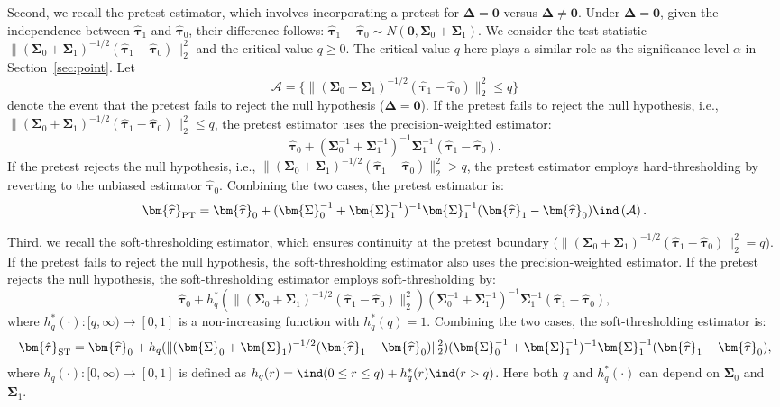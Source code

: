 \documentclass[11pt]{article}
\newcommand{\htau}{\widehat\tau}
\numberwithin{equation}{section}
\theoremstyle{definition}
\begin{document}
Second, we recall the pretest estimator, which involves incorporating a pretest for $\bm{\Delta} = \bm{0}$ versus $\bm{\Delta} \neq \bm{0}$. Under $\bm{\Delta} = \bm{0}$, given the independence between $\bm{\htau}_1$ and $\bm{\htau}_0$, their difference follows: $\bm{\htau}_1 - \bm{\htau}_0 \sim N(\bm{0}, \bm{\Sigma}_0 + \bm{\Sigma}_1)$. We consider the test statistic $\lVert (\bm{\Sigma}_0+ \bm{\Sigma}_1)^{-1/2}(\bm{\htau}_1 - \bm{\htau}_0) \rVert_2^2$ and the critical value $q \ge 0$. The critical value $q$ here plays a similar role as the significance level $\alpha$ in Section~\ref{sec:point}. Let $$\mathcal{A} = \{\lVert (\bm{\Sigma}_0+ \bm{\Sigma}_1)^{-1/2}(\bm{\htau}_1 - \bm{\htau}_0) \rVert_2^2 \le q\}$$ denote the event that the pretest fails to reject the null hypothesis ($\bm{\Delta} = \bm{0}$). If the pretest fails to reject the null hypothesis, i.e., $\lVert (\bm{\Sigma}_0+ \bm{\Sigma}_1)^{-1/2}(\bm{\htau}_1 - \bm{\htau}_0) \rVert_2^2 \le q$, the pretest estimator uses the precision-weighted estimator:
\[
  \bm{\htau}_0 + (\bm{\Sigma}_0^{-1} + \bm{\Sigma}_1^{-1})^{-1} \bm{\Sigma}_1^{-1} (\bm{\htau}_1 - \bm{\htau}_0).
\]
If the pretest rejects the null hypothesis, i.e., $\lVert (\bm{\Sigma}_0+ \bm{\Sigma}_1)^{-1/2}(\bm{\htau}_1 - \bm{\htau}_0) \rVert_2^2 > q$, the pretest estimator employs hard-thresholding by reverting to the unbiased estimator $\bm{\htau}_0$. Combining the two cases, the pretest estimator is:
\[
\bm{\htau}_{\rm PT} = \bm{\htau}_0 + (\bm{\Sigma}_0^{-1} + \bm{\Sigma}_1^{-1})^{-1} \bm{\Sigma}_1^{-1} (\bm{\htau}_1 - \bm{\htau}_0) \ind\left(\mathcal{A}\right).
\]

Third, we recall the soft-thresholding estimator, which ensures continuity at the pretest boundary ($\lVert (\bm{\Sigma}_0+ \bm{\Sigma}_1)^{-1/2}(\bm{\htau}_1 - \bm{\htau}_0) \rVert_2^2 = q$). If the pretest fails to reject the null hypothesis, the soft-thresholding estimator also uses the precision-weighted estimator. If the pretest rejects the null hypothesis, the soft-thresholding estimator employs soft-thresholding by:
\[
  \bm{\htau}_0 + h_q^*(\lVert (\bm{\Sigma}_0+ \bm{\Sigma}_1)^{-1/2}(\bm{\htau}_1 - \bm{\htau}_0) \rVert_2^2)(\bm{\Sigma}_0^{-1} + \bm{\Sigma}_1^{-1})^{-1}\bm{\Sigma}_1^{-1}(\bm{\htau}_1 - \bm{\htau}_0),
\]
where $h_q^*(\cdot): [q,\infty) \to [0,1]$ is a non-increasing function with $h_q^*(q)=1$. Combining the two cases, the soft-thresholding estimator is:
\[
  \bm{\hat\tau}_{\rm ST} = \bm{\htau}_0 + h_q(\lVert (\bm{\Sigma}_0+ \bm{\Sigma}_1)^{-1/2}(\bm{\htau}_1 - \bm{\htau}_0) \rVert_2^2)(\bm{\Sigma}_0^{-1} + \bm{\Sigma}_1^{-1})^{-1}\bm{\Sigma}_1^{-1}(\bm{\htau}_1 - \bm{\htau}_0),
\]
where $h_q(\cdot): [0,\infty) \to [0,1]$ is defined as $h_q(r) = \ind(0 \le r \le q) + h_q^*(r) \ind(r > q)$. Here both $q$ and $h_q^*(\cdot)$ can depend on $\bm{\Sigma}_0$ and $\bm{\Sigma}_1$.
\end{document}
